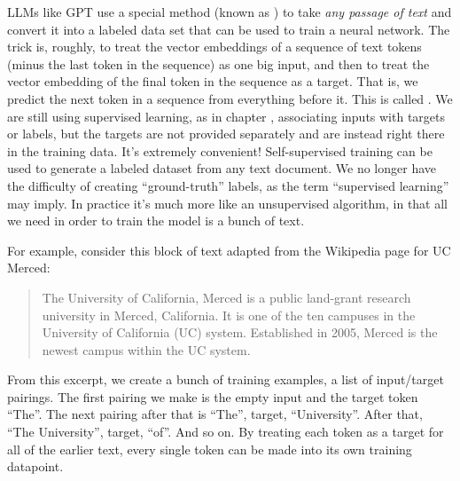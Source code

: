 LLMs like GPT use a special method (known as ) to
take \emph{any passage of text} and convert it into a labeled data set that can
be used to train a neural network. The trick is, roughly, to treat the vector
embeddings of a sequence of text tokens (minus the last token in the sequence)
as one big input, and then to treat the vector embedding of the final token in
the sequence as a target. That is, we predict the next token in a sequence from everything before it.
 This is called .
We are still using supervised learning, as in chapter ,
associating inputs with targets or labels, but the targets are not provided
separately and are instead right there in the training data. It's extremely
convenient! Self-supervised training can be used to generate a labeled dataset
from any text document. We no longer have the difficulty of creating
``ground-truth'' labels, as the term ``supervised learning'' may imply. In
practice it's much more like an unsupervised algorithm, in that all we need in
order to train the model is a bunch of text.

For example, consider this block of text adapted from the Wikipedia page for UC
Merced:

\begin{quote}
The University of California, Merced is a public land-grant research university
in Merced, California. It is one of the ten campuses in the University of
California (UC) system. Established in 2005, Merced is the newest campus within
the UC system.
\end{quote}

From this excerpt, we create a bunch of training examples, a list of
input/target pairings. The first pairing we make is the empty input and the
target token ``The''. The next pairing after that is ``The'', target,
``University''. After that, ``The University'', target, ``of''. And so on. By
treating each token as a target for all of the earlier text, every single token
can be made into its own training datapoint.

